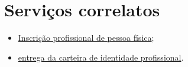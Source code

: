 \section{Serviços correlatos}

\begin{itemize}
	\item
	\hyperref[chap:pf-inscricao]{Inscrição profissional de pessoa física};
	\item
	\hyperref[chap:pf-cip]{entrega da carteira de identidade profissional}.
\end{itemize}

\sumario